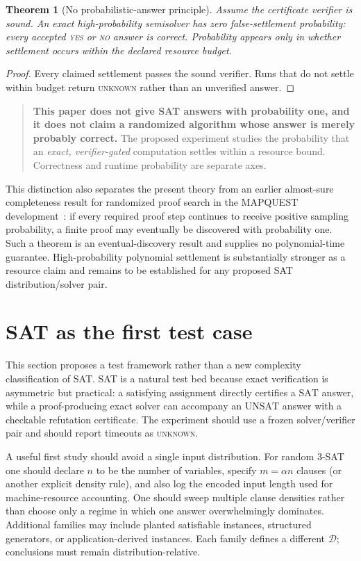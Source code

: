 \documentclass[11pt]{article}
\newtheorem{theorem}{Theorem}[section]
\theoremstyle{definition}
\newcommand{\SAT}{\ensuremath{\mathrm{SAT}}}
\newcommand{\UNSAT}{\ensuremath{\mathrm{UNSAT}}}
\newcommand{\UNKNOWN}{\textsc{unknown}}
\begin{document}
\begin{theorem}[No probabilistic-answer principle]\label{thm:noerror}
Assume the certificate verifier is sound. An exact high-probability semisolver has zero false-settlement probability: every accepted \textnormal{\textsc{yes}} or \textnormal{\textsc{no}} answer is correct. Probability appears only in whether settlement occurs within the declared resource budget.
\end{theorem}

\begin{proof}
Every claimed settlement passes the sound verifier. Runs that do not settle within budget return \textsc{unknown} rather than an unverified answer.
\end{proof}

\begin{quote}
\textbf{This paper does not give SAT answers with probability one, and it does not claim a randomized algorithm whose answer is merely probably correct.} The proposed experiment studies the probability that an \emph{exact, verifier-gated} computation settles within a resource bound. Correctness and runtime probability are separate axes.
\end{quote}

This distinction also separates the present theory from an earlier almost-sure completeness result for randomized proof search in the MAPQUEST development~\cite{TennesonMAPQUEST}: if every required proof step continues to receive positive sampling probability, a finite proof may eventually be discovered with probability one. Such a theorem is an eventual-discovery result and supplies no polynomial-time guarantee. High-probability polynomial settlement is substantially stronger as a resource claim and remains to be established for any proposed SAT distribution/solver pair.

\section{SAT as the first test case}
This section proposes a test framework rather than a new complexity classification of SAT. SAT is a natural test bed because exact verification is asymmetric but practical: a satisfying assignment directly certifies a \SAT{} answer, while a proof-producing exact solver can accompany an \UNSAT{} answer with a checkable refutation certificate. The experiment should use a frozen solver/verifier pair and should report timeouts as \UNKNOWN{}.

A useful first study should avoid a single input distribution. For random $3$-SAT one should declare $n$ to be the number of variables, specify $m=\alpha n$ clauses (or another explicit density rule), and also log the encoded input length used for machine-resource accounting. One should sweep multiple clause densities rather than choose only a regime in which one answer overwhelmingly dominates. Additional families may include planted satisfiable instances, structured generators, or application-derived instances. Each family defines a different $\mathcal D$; conclusions must remain distribution-relative.
\end{document}
